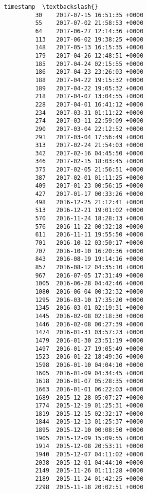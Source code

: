 \documentclass[11pt]{article}
\begin{document}
\begin{Verbatim}[commandchars=\\\{\}]
                               timestamp  \textbackslash{}
         30    2017-07-15 16:51:35 +0000   
         55    2017-07-02 21:58:53 +0000   
         64    2017-06-27 12:14:36 +0000   
         113   2017-06-02 19:38:25 +0000   
         148   2017-05-13 16:15:35 +0000   
         179   2017-04-26 12:48:51 +0000   
         185   2017-04-24 02:15:55 +0000   
         186   2017-04-23 23:26:03 +0000   
         188   2017-04-22 19:15:32 +0000   
         189   2017-04-22 19:05:32 +0000   
         218   2017-04-07 13:04:55 +0000   
         228   2017-04-01 16:41:12 +0000   
         234   2017-03-31 01:11:22 +0000   
         274   2017-03-11 22:59:09 +0000   
         290   2017-03-04 22:12:52 +0000   
         291   2017-03-04 17:56:49 +0000   
         313   2017-02-24 21:54:03 +0000   
         342   2017-02-16 04:45:50 +0000   
         346   2017-02-15 18:03:45 +0000   
         375   2017-02-05 21:56:51 +0000   
         387   2017-02-01 01:11:25 +0000   
         409   2017-01-23 00:56:15 +0000   
         427   2017-01-17 00:33:26 +0000   
         498   2016-12-25 21:12:41 +0000   
         513   2016-12-21 19:01:02 +0000   
         570   2016-11-24 18:28:13 +0000   
         576   2016-11-22 00:32:18 +0000   
         611   2016-11-11 19:55:50 +0000   
         701   2016-10-12 03:50:17 +0000   
         707   2016-10-10 16:20:36 +0000   
         843   2016-08-19 19:14:16 +0000   
         857   2016-08-12 04:35:10 +0000   
         967   2016-07-05 17:31:49 +0000   
         1005  2016-06-28 04:42:46 +0000   
         1080  2016-06-04 00:32:32 +0000   
         1295  2016-03-10 17:35:20 +0000   
         1345  2016-03-01 02:19:31 +0000   
         1445  2016-02-08 02:18:30 +0000   
         1446  2016-02-08 00:27:39 +0000   
         1474  2016-01-31 03:57:23 +0000   
         1479  2016-01-30 23:51:19 +0000   
         1497  2016-01-27 19:05:49 +0000   
         1523  2016-01-22 18:49:36 +0000   
         1598  2016-01-10 04:04:10 +0000   
         1605  2016-01-09 04:34:45 +0000   
         1618  2016-01-07 05:28:35 +0000   
         1663  2016-01-01 06:22:03 +0000   
         1689  2015-12-28 05:07:27 +0000   
         1774  2015-12-19 01:25:31 +0000   
         1819  2015-12-15 02:32:17 +0000   
         1844  2015-12-13 01:25:37 +0000   
         1895  2015-12-10 00:08:50 +0000   
         1905  2015-12-09 15:09:55 +0000   
         1914  2015-12-08 20:53:11 +0000   
         1940  2015-12-07 04:11:02 +0000   
         2038  2015-12-01 04:44:10 +0000   
         2149  2015-11-26 01:11:28 +0000   
         2189  2015-11-24 01:42:25 +0000   
         2298  2015-11-18 20:02:51 +0000   
         

\end{Verbatim}
\end{document}
